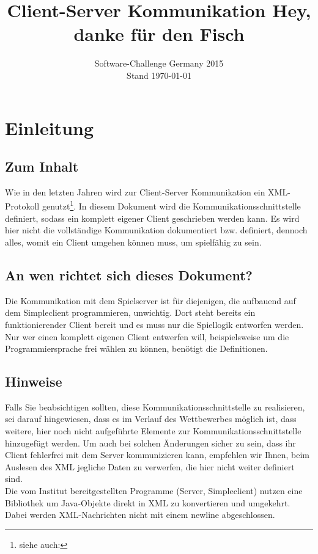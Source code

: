 \documentclass[12pt,a4paper, ngerman, oneside]{scrartcl}
\date{Software-Challenge Germany 2015\\Stand \today}
\title{Client-Server Kommunikation Hey, danke für den Fisch}
\begin{document}
\maketitle
\thispagestyle{empty}
\tableofcontents
\thispagestyle{empty}
\newpage
\setcounter{page}{1}
\section{Einleitung}
\subsection*{Zum Inhalt} Wie in den letzten Jahren wird zur Client-Server
Kommunikation ein XML-Protokoll genutzt\footnote{siehe auch:
}. In diesem
Dokument wird die Kommunikationsschnittstelle definiert, sodass ein komplett
eigener Client geschrieben werden kann. Es wird hier nicht die vollständige
Kommunikation dokumentiert bzw. definiert, dennoch alles, womit ein Client
umgehen können muss, um spielfähig zu sein.
\subsection*{An wen richtet sich dieses Dokument?} Die Kommunikation mit dem
Spielserver ist für diejenigen, die aufbauend auf dem Simpleclient
programmieren, unwichtig. Dort steht bereits ein funktionierender Client bereit
und es muss nur die Spiellogik entworfen werden. \\
Nur wer einen komplett eigenen Client entwerfen will, beispielsweise um die
Programmiersprache frei wählen zu können, benötigt die Definitionen.

\subsection*{Hinweise} Falls Sie beabsichtigen sollten, diese
Kommunikationsschnittstelle zu realisieren, sei darauf hingewiesen, dass es im
Verlauf des Wettbewerbes möglich ist, dass weitere, hier noch nicht aufgeführte
Elemente zur Kommunikationsschnittstelle hinzugefügt werden. Um auch bei solchen
Änderungen sicher zu sein, dass ihr Client fehlerfrei mit dem Server
kommunizieren kann, empfehlen wir Ihnen, beim Auslesen des XML jegliche Daten zu
verwerfen, die hier nicht weiter definiert sind. \bigskip \\
Die vom Institut bereitgestellten Programme (Server, Simpleclient) nutzen eine
Bibliothek um Java-Objekte direkt in XML zu konvertieren und umgekehrt. 
Dabei werden XML-Nachrichten nicht mit einem newline abgeschlossen.
\end{document}
